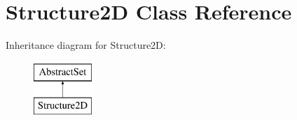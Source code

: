 \hypertarget{classStructure2D}{\section{Structure2\-D Class Reference}
\label{classStructure2D}
}
Inheritance diagram for Structure2\-D\-:\begin{figure}[H]
\begin{center}
\leavevmode
\includegraphics[height=2.000000cm]{classStructure2D}
\end{center}
\end{figure}
